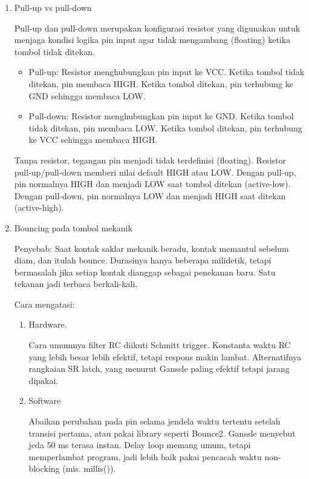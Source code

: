 \begin{enumerate}
	\item Pull-up vs pull-down
    
    Pull-up dan pull-down merupakan konfigurasi resistor yang digunakan untuk menjaga kondisi logika pin input agar tidak mengambang (floating) ketika tombol tidak ditekan.

    \begin{itemize}
        \item Pull-up: Resistor menghubungkan pin input ke VCC. Ketika tombol tidak ditekan, pin membaca HIGH. Ketika tombol ditekan, pin terhubung ke GND sehingga membaca LOW.
        \item Pull-down: Resistor menghubungkan pin input ke GND. Ketika tombol tidak ditekan, pin membaca LOW. Ketika tombol ditekan, pin terhubung ke VCC sehingga membaca HIGH.
    \end{itemize}
    
    Tanpa resistor, tegangan pin menjadi tidak terdefinisi (floating). Resistor pull-up/pull-down memberi nilai default HIGH atau LOW. Dengan pull-up, pin normalnya HIGH dan menjadi LOW saat tombol ditekan (active-low). Dengan pull-down, pin normalnya LOW dan menjadi HIGH saat ditekan (active-high).

    \item Bouncing pada tombol mekanik

    Penyebab: Saat kontak saklar mekanik beradu, kontak memantul sebelum diam, dan itulah bounce. Durasinya hanya beberapa milidetik, tetapi bermasalah jika setiap kontak dianggap sebagai penekanan baru. Satu tekanan jadi terbaca berkali-kali.

    Cara mengatasi:
    \begin{enumerate}
        \item Hardware. 
        
        Cara umumnya filter RC diikuti Schmitt trigger. Konstanta waktu RC yang lebih besar lebih efektif, tetapi respons makin lambat. Alternatifnya rangkaian SR latch, yang menurut Ganssle paling efektif tetapi jarang dipakai.

        \item Software

        Abaikan perubahan pada pin selama jendela waktu tertentu setelah transisi pertama, atau pakai library seperti Bounce2. Ganssle menyebut jeda 50 ms terasa instan. Delay loop memang umum, tetapi memperlambat program, jadi lebih baik pakai pencacah waktu non-blocking (mis. millis()).
    \end{enumerate}


\end{enumerate}

